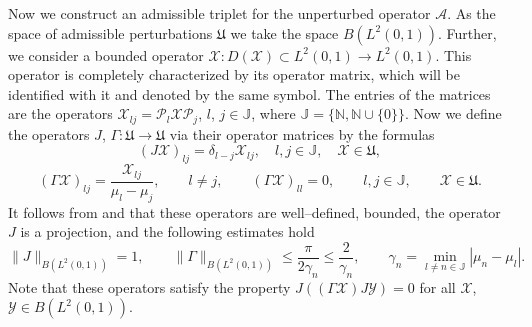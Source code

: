 \documentclass[11pt,centertags,reqno,twoside]{amsart}
\numberwithin{equation}{section}
\theoremstyle{definition}
\theoremstyle{remark}
\begin{document}
Now we construct an admissible triplet for the unperturbed operator $\mathcal{A}$.
As the space of admissible perturbations $\mathfrak{U}$ we take the space
$B(L^2(0, 1))$. Further, we consider a bounded operator
$\mathcal{X}: D(\mathcal{X})\subset L^2(0, 1)\to L^2(0, 1)$. This operator
is completely characterized by its operator matrix, which will be identified with
it and denoted by the same symbol. The entries of the matrices are the operators
$\mathcal{X}_{lj}=\mathcal{P}_l\mathcal{X}\mathcal{P}_j$, $l$, $j\in\mathbb{J}$,
where $\mathbb{J}=\{\mathbb{N}, \mathbb{N}\cup\{0\}\}$. Now we define the
operators $J$, $\Gamma: \mathfrak{U}\to\mathfrak{U}$ via their operator matrices
by the formulas
\begin{equation}\label{j}
(J\mathcal{X})_{lj}=\delta_{l-j}\mathcal{X}_{lj}, \quad l, j\in\mathbb{J}, \quad
\mathcal{X}\in\mathfrak{U},
\end{equation}
\begin{equation}\label{gamma}
(\Gamma\mathcal{X})_{lj}=\frac{\mathcal{X}_{lj}}{\mu_l-\mu_j},
\qquad l\ne j, \qquad (\Gamma\mathcal{X})_{ll}=0, \qquad l, j\in\mathbb{J},
\qquad \mathcal{X}\in\mathfrak{U}.
\end{equation}
It follows from \cite[Lemma~3.4]{BaskKrUsk} and \cite[Theorem~1.6]{Bask83} that these operators are well--defined,
bounded, the operator $J$ is a projection, and the following estimates hold
\begin{equation}\label{estJG}
\|J\|_{B(L^2(0, 1))}=1, \qquad \|\Gamma\|_{B(L^2(0, 1))}\leqslant\frac{\pi}{2\gamma_n}\leqslant\frac{2}{\gamma_n},
\qquad \gamma_n=\min_{l\ne n\in\mathbb{J}}|\mu_n-\mu_l|.
\end{equation}
Note that these operators satisfy the property $J((\Gamma\mathcal{X})J\mathcal{Y})=0$
for all $\mathcal{X}$, $\mathcal{Y}\in B(L^2(0, 1))$.
\end{document}
